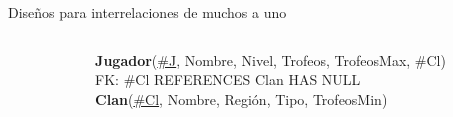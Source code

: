 \begin{frame}{Dise\~nos para interrelaciones de muchos a uno}
\begin{columns}[T]
\begin{column}{0.48\linewidth}
        \end{column}

        \begin{column}{0.5\linewidth}
            \begin{scriptsize}
                \textbf{Jugador}(\underline{\#J}, Nombre, Nivel, Trofeos, TrofeosMax, \#Cl)\\[1mm]
                \hspace{4mm} FK: \#Cl REFERENCES Clan HAS NULL\\[2mm]
                \textbf{Clan}(\underline{\#Cl}, Nombre, Regi\'on, Tipo, TrofeosMin)\\[2mm]
            \end{scriptsize}

        \end{column}
        
    \end{columns}

\end{frame}


